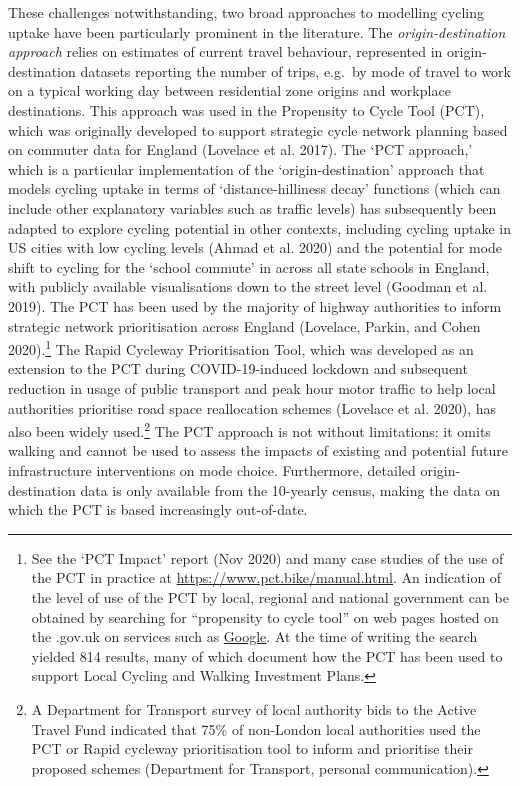 \documentclass[galley]{jtlu-article-2col}
\begin{document}
These challenges notwithstanding, two broad approaches to modelling cycling uptake have been particularly prominent in the literature.
The \emph{origin-destination approach} relies on estimates of current travel behaviour, represented in origin-destination datasets reporting the number of trips, e.g.~by mode of travel to work on a typical working day between residential zone origins and workplace destinations. This approach was used in the Propensity to Cycle Tool (PCT), which was originally developed to support strategic cycle network planning based on commuter data for England (Lovelace et al. 2017). The `PCT approach,' which is a particular implementation of the `origin-destination' approach that models cycling uptake in terms of `distance-hilliness decay' functions (which can include other explanatory variables such as traffic levels) has subsequently been adapted to explore cycling potential in other contexts, including cycling uptake in US cities with low cycling levels (Ahmad et al. 2020) and the potential for mode shift to cycling for the `school commute' in across all state schools in England, with publicly available visualisations down to the street level (Goodman et al. 2019).
The PCT has been used by the majority of highway authorities to inform strategic network prioritisation across England (Lovelace, Parkin, and Cohen 2020).\footnote{
  See the `PCT Impact' report (Nov 2020) and many case studies of the use of the PCT in practice at \url{https://www.pct.bike/manual.html}.
  An indication of the level of use of the PCT by local, regional and national government can be obtained by searching for ``propensity to cycle tool'' on web pages hosted on the .gov.uk on services such as \href{https://www.google.com/search?channel=fs\&q=site\%3A.gov.uk+\%22propensity+to+cycle+tool\%22}{Google}.
  At the time of writing the search yielded 814 results, many of which document how the PCT has been used to support Local Cycling and Walking Investment Plans.}
The Rapid Cycleway Prioritisation Tool, which was developed as an extension to the PCT during COVID-19-induced lockdown and subsequent reduction in usage of public transport and peak hour motor traffic to help local authorities prioritise road space reallocation schemes (Lovelace et al. 2020), has also been widely used.\footnote{
  A Department for Transport survey of local authority bids to the Active Travel Fund indicated that 75\% of non-London local authorities used the PCT or Rapid cycleway prioritisation tool to inform and prioritise their proposed schemes (Department for Transport, personal communication).}
The PCT approach is not without limitations:
it omits walking and cannot be used to assess the impacts of existing and potential future infrastructure interventions on mode choice.
Furthermore, detailed origin-destination data is only available from the 10-yearly census, making the data on which the PCT is based increasingly out-of-date.
\end{document}
